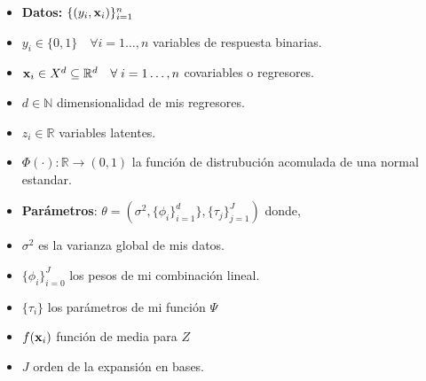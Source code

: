 \documentclass[../../Main/Main.tex]{subfiles}
\begin{document}
\begin{itemize}
	\item \textbf{Datos:} $\{(y_i,\mathbf{x}_i)\}_{i = 1}^n$
	\item $y_i \in \{0,1\}\quad \forall i = 1\ldots,n$  variables de respuesta binarias.
	\item $\mathbf{x}_i \in X^d \subseteq \mathbb{R}^d\quad \forall \; i = 1\ldots,n$ covariables o regresores.
	\item $d \in \mathbb{N}$ dimensionalidad de mis regresores.
	\item $z_i \in \mathbb{R}$ variables latentes.
	\item $\Phi(\cdot):\mathbb{R}\rightarrow(0,1)$ la función de distrubución acomulada de una normal estandar.
	 \item \textbf{Parámetros}: $\theta = (\sigma^2, \{\phi_i\}_{i=1}^d\},\{\tau_j\}_{j=1}^J)$ donde, %
	\item $\sigma^2$ es la varianza global de mis datos.
	\item $\{\phi_i\}_{i=0}^J$ los pesos de mi combinación lineal.
	\item $\{\tau_i\}$ los parámetros de mi función $\Psi$
	\item $f(\mathbf{x}_i)$ función de media para $Z$
	\item $J$ orden de la expansión en bases.
\end{itemize}
\end{document}
